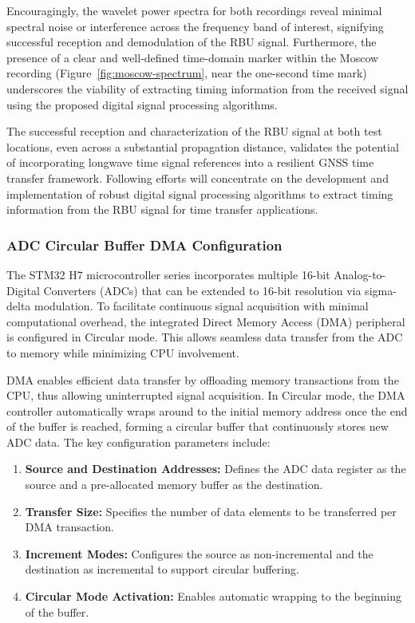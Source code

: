 \documentclass[12pt, a4paper]{extarticle}
\begin{document}
Encouragingly, the wavelet power spectra for both recordings reveal minimal
spectral noise or interference across the frequency band of interest,
signifying successful reception and demodulation of the RBU signal. Furthermore,
the presence of a clear and well-defined time-domain marker within the Moscow
recording (Figure~\ref{fig:moscow-spectrum}, near the one-second time mark)
underscores the viability of extracting timing information from the received
signal using the proposed digital signal processing algorithms.

The successful reception and characterization of the RBU signal at both test
locations, even across a substantial propagation distance, validates the
potential of incorporating longwave time signal references into a resilient
GNSS time transfer framework. Following efforts will concentrate on the
development and implementation of robust digital signal processing algorithms
to extract timing information from the RBU signal for time transfer
applications.

\subsubsection{ADC Circular Buffer DMA Configuration}

The STM32 H7 microcontroller series incorporates multiple 16-bit
Analog-to-Digital Converters (ADCs) that can be extended to 16-bit resolution
via sigma-delta modulation. To facilitate continuous signal acquisition with
minimal computational overhead, the integrated Direct Memory Access (DMA)
peripheral is configured in Circular mode. This allows seamless data transfer
from the ADC to memory while minimizing CPU involvement.

DMA enables efficient data transfer by offloading memory transactions from the
CPU, thus allowing uninterrupted signal acquisition. In Circular mode, the DMA
controller automatically wraps around to the initial memory address once the
end of the buffer is reached, forming a circular buffer that continuously
stores new ADC data. The key configuration parameters include:

\begin{enumerate}[noitemsep]
    \item \textbf{Source and Destination Addresses:} Defines the ADC data
        register as the source and a pre-allocated memory buffer as the
        destination.
    \item \textbf{Transfer Size:} Specifies the number of data elements to be
        transferred per DMA transaction.
    \item \textbf{Increment Modes:} Configures the source as non-incremental
        and the destination as incremental to support circular buffering.
    \item \textbf{Circular Mode Activation:} Enables automatic wrapping to the
        beginning of the buffer.
\end{enumerate}
\end{document}
